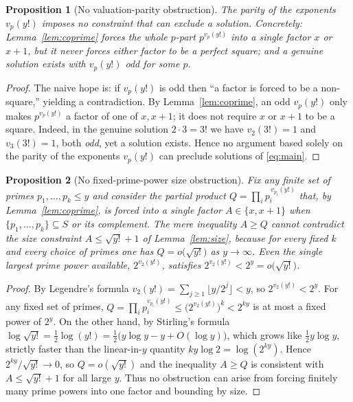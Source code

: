 \documentclass{amsart}
\theoremstyle{plain}
\newtheorem{proposition}{Proposition}
\theoremstyle{remark}
\begin{document}
\begin{proposition}[No valuation-parity obstruction]\label{prop:noparity}
The parity of the exponents $v_p(y!)$ imposes \emph{no} constraint that can
exclude a solution. Concretely: Lemma~\ref{lem:coprime} forces the whole
$p$-part $p^{v_p(y!)}$ into a single factor $x$ or $x+1$, but it never forces
either factor to be a perfect square; and a genuine solution exists with
$v_p(y!)$ odd for some $p$.
\end{proposition}

\begin{proof}
The naive hope is: if $v_p(y!)$ is odd then ``a factor is forced to be a
non-square,'' yielding a contradiction. By Lemma~\ref{lem:coprime}, an odd
$v_p(y!)$ only makes $p^{v_p(y!)}$ a factor of one of $x,x+1$; it does not
require $x$ or $x+1$ to be a square. Indeed, in the genuine solution
$2\cdot3=3!$ we have $v_2(3!)=1$ and $v_3(3!)=1$, both \emph{odd}, yet a
solution exists. Hence no argument based solely on the parity of the
exponents $v_p(y!)$ can preclude solutions of \eqref{eq:main}.
\end{proof}

\begin{proposition}[No fixed-prime-power size obstruction]\label{prop:nosize}
Fix any finite set of primes $p_1,\dots,p_k\le y$ and consider the partial
product $Q=\prod_{i}p_i^{\,v_{p_i}(y!)}$ that, by Lemma~\ref{lem:coprime}, is
forced into a single factor $A\in\{x,x+1\}$ when $\{p_1,\dots,p_k\}\subseteq
S$ or its complement. The mere inequality $A\ge Q$ cannot contradict the size
constraint $A\le\sqrt{y!}+1$ of Lemma~\ref{lem:size}, because for every fixed
$k$ and every choice of primes one has $Q=o\!\bigl(\sqrt{y!}\bigr)$ as
$y\to\infty$. Even the single largest prime power available, $2^{v_2(y!)}$,
satisfies $2^{v_2(y!)}<2^{y}=o\!\bigl(\sqrt{y!}\bigr)$.
\end{proposition}

\begin{proof}
By Legendre's formula $v_2(y!)=\sum_{j\ge1}\lfloor y/2^j\rfloor<y$, so
$2^{v_2(y!)}<2^{y}$. For any fixed set of primes,
$Q=\prod_i p_i^{v_{p_i}(y!)}\le \bigl(2^{v_2(y!)}\bigr)^{k}<2^{ky}$ is at most
a fixed power of $2^{y}$. On the other hand, by Stirling's formula
$\log\sqrt{y!}=\tfrac12\log(y!)=\tfrac12\bigl(y\log y-y+O(\log y)\bigr)$,
which grows like $\tfrac12 y\log y$, strictly faster than the linear-in-$y$
quantity $ky\log 2=\log(2^{ky})$. Hence $2^{ky}/\sqrt{y!}\to0$, so
$Q=o(\sqrt{y!})$ and the inequality $A\ge Q$ is consistent with
$A\le\sqrt{y!}+1$ for all large $y$. Thus no obstruction can arise from
forcing finitely many prime powers into one factor and bounding by size.
\end{proof}
\end{document}
